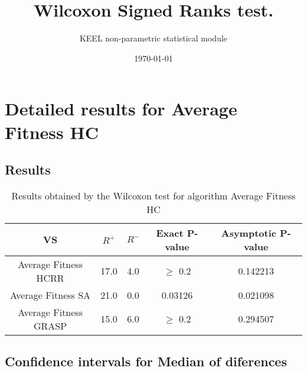 \documentclass[a4paper,10pt]{article}
\title{Wilcoxon Signed Ranks test.}
\date{\today}
\author{KEEL non-parametric statistical module}
\begin{document}
\pagestyle{empty}
\maketitle
\thispagestyle{empty}



\section{Detailed results for Average Fitness HC    }


\subsection{Results}

\begin{table}[!htp]
\centering\small
\begin{tabular}{
|c|c|c|c|c|}
\hline
 VS & $R^{+}$ & $R^{-}$ & Exact P-value & Asymptotic P-value \\ \hline 
Average Fitness HCRR    & 17.0 & 4.0 & $\geq$ 0.2 & 0.142213\\ \hline 
Average Fitness SA   & 21.0 & 0.0 & 0.03126 & 0.021098\\ \hline 
Average Fitness GRASP & 15.0 & 6.0 & $\geq$ 0.2 & 0.294507\\ \hline 

\end{tabular}
\caption{Results obtained by the Wilcoxon test for algorithm Average Fitness HC    }
\end{table}

\subsection{Confidence intervals for Median of diferences}
\end{document}

